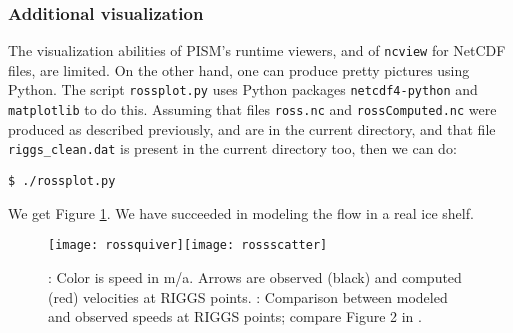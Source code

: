 \subsubsection*{Additional visualization}  The visualization abilities of PISM's runtime viewers, and of \texttt{ncview} for NetCDF files, are limited.  On the other hand, one can produce pretty pictures using Python.  The script \texttt{rossplot.py} uses Python packages \texttt{netcdf4-python} and \texttt{matplotlib} to do this.  Assuming that files \texttt{ross.nc} and \texttt{rossComputed.nc} were produced as described previously, and are in the current directory, and that file \texttt{riggs_clean.dat} is present in the current directory too, then we can do:

\begin{verbatim}
$ ./rossplot.py
\end{verbatim}

\noindent We get Figure \ref{fig:rosspython}.  We have succeeded in modeling the flow in a real ice shelf.

\begin{figure}[ht]
\centering
\mbox{\texttt{[image: rossquiver]}\quad \texttt{[image: rossscatter]}}
\caption{: Color is speed in m/a.  Arrows are observed (black) and computed (red) velocities at RIGGS points.  : Comparison between modeled and observed speeds at RIGGS points; compare Figure 2 in \cite{MacAyealetal}.}
\label{fig:rosspython}
\end{figure}


